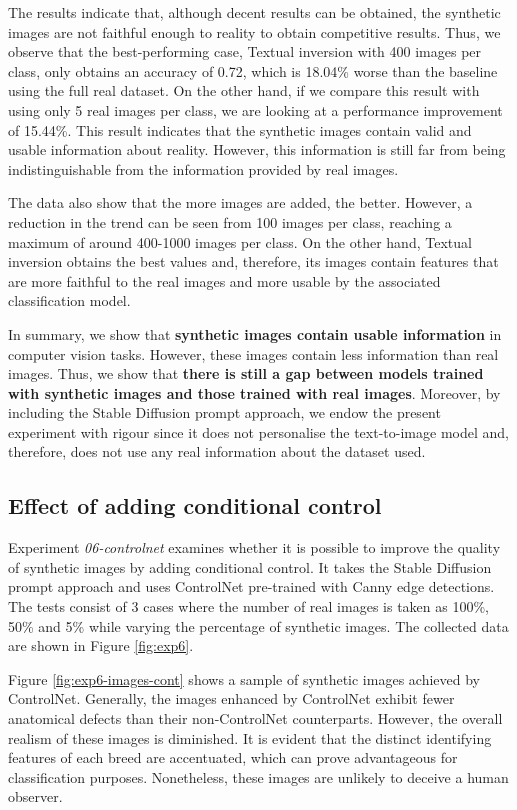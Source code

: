 The results indicate that, although decent results can be obtained, the synthetic images are not faithful enough to reality to obtain competitive results. Thus, we observe that the best-performing case, Textual inversion with 400 images per class, only obtains an accuracy of 0.72, which is 18.04\% worse than the baseline using the full real dataset. On the other hand, if we compare this result with using only 5 real images per class, we are looking at a performance improvement of 15.44\%. This result indicates that the synthetic images contain valid and usable information about reality. However, this information is still far from being indistinguishable from the information provided by real images.

The data also show that the more images are added, the better. However, a reduction in the trend can be seen from 100 images per class, reaching a maximum of around 400-1000 images per class. On the other hand, Textual inversion obtains the best values and, therefore, its images contain features that are more faithful to the real images and more usable by the associated classification model.

In summary, we show that \textbf{synthetic images contain usable information} in computer vision tasks. However, these images contain less information than real images. Thus, we show that \textbf{there is still a gap between models trained with synthetic images and those trained with real images}. Moreover, by including the Stable Diffusion prompt approach, we endow the present experiment with rigour since it does not personalise the text-to-image model and, therefore, does not use any real information about the dataset used.

\subsection{Effect of adding conditional control} \label{sec: exp-06}

Experiment \textit{06-controlnet} examines whether it is possible to improve the quality of synthetic images by adding conditional control. It takes the Stable Diffusion prompt approach and uses ControlNet pre-trained with Canny edge detections. The tests consist of 3 cases where the number of real images is taken as 100\%, 50\% and 5\% while varying the percentage of synthetic images. The collected data are shown in Figure \ref{fig:exp6}. 

Figure \ref{fig:exp6-images-cont} shows a sample of synthetic images achieved by ControlNet. Generally, the images enhanced by ControlNet exhibit fewer anatomical defects than their non-ControlNet counterparts. However, the overall realism of these images is diminished. It is evident that the distinct identifying features of each breed are accentuated, which can prove advantageous for classification purposes. Nonetheless, these images are unlikely to deceive a human observer.

